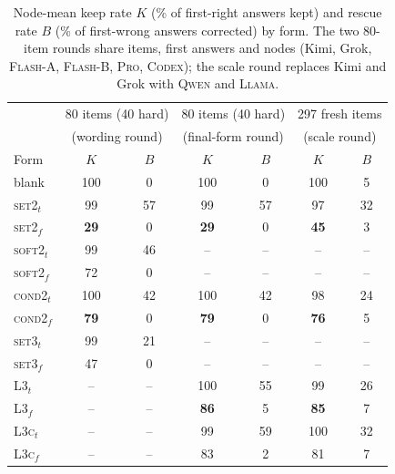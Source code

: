 \documentclass[11pt]{article}
\begin{document}
\begin{table}[t]
\centering\footnotesize
\setlength{\tabcolsep}{4pt}
\begin{tabular}{@{}lcccccc@{}}
\toprule
& \multicolumn{2}{c}{80 items (40 hard)} & \multicolumn{2}{c}{80 items (40 hard)} & \multicolumn{2}{c}{297 fresh items} \\
& \multicolumn{2}{c}{(wording round)} & \multicolumn{2}{c}{(final-form round)} & \multicolumn{2}{c}{(scale round)} \\
Form & $K$ & $B$ & $K$ & $B$ & $K$ & $B$ \\
\midrule
blank & 100 & 0 & 100 & 0 & 100 & 5 \\
\textsc{set2}$_t$ & 99 & 57 & 99 & 57 & 97 & 32 \\
\textsc{set2}$_f$ & \textbf{29} & 0 & \textbf{29} & 0 & \textbf{45} & 3 \\
\textsc{soft2}$_t$ & 99 & 46 & -- & -- & -- & -- \\
\textsc{soft2}$_f$ & 72 & 0 & -- & -- & -- & -- \\
\textsc{cond2}$_t$ & 100 & 42 & 100 & 42 & 98 & 24 \\
\textsc{cond2}$_f$ & \textbf{79} & 0 & \textbf{79} & 0 & \textbf{76} & 5 \\
\textsc{set3}$_t$ & 99 & 21 & -- & -- & -- & -- \\
\textsc{set3}$_f$ & 47 & 0 & -- & -- & -- & -- \\
\textsc{L3}$_t$ & -- & -- & 100 & 55 & 99 & 26 \\
\textsc{L3}$_f$ & -- & -- & \textbf{86} & 5 & \textbf{85} & 7 \\
\textsc{L3c}$_t$ & -- & -- & 99 & 59 & 100 & 32 \\
\textsc{L3c}$_f$ & -- & -- & 83 & 2 & 81 & 7 \\
\bottomrule
\end{tabular}
\caption{Node-mean keep rate $K$ (\% of first-right answers kept) and rescue rate $B$ (\% of first-wrong answers corrected) by form. The two 80-item rounds share items, first answers and nodes (Kimi, Grok, \textsc{Flash-A}, \textsc{Flash-B}, \textsc{Pro}, \textsc{Codex}); the scale round replaces Kimi and Grok with \textsc{Qwen} and \textsc{Llama}.}
\label{tab:kb}
\end{table}
\end{document}
